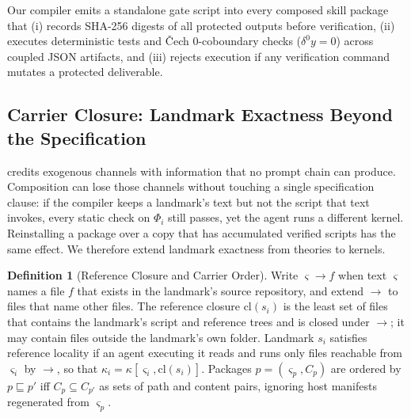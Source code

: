 \documentclass[11pt]{article}
\theoremstyle{definition}
\newtheorem{definition}{Definition}
\theoremstyle{plain}
\begin{document}
Our compiler emits a standalone gate script into every composed skill package that (i) records SHA-256 digests of all protected outputs before verification, (ii) executes deterministic tests and \v{C}ech 0-coboundary checks ($\delta^0 y = 0$) across coupled JSON artifacts, and (iii) rejects execution if any verification command mutates a protected deliverable.

\subsection{Carrier Closure: Landmark Exactness Beyond the Specification}
\label{subsec:carrier}

 credits exogenous channels with information that no prompt chain can produce. Composition can lose those channels without touching a single specification clause: if the compiler keeps a landmark's text but not the script that text invokes, every static check on $\Phi_i$ still passes, yet the agent runs a different kernel. Reinstalling a package over a copy that has accumulated verified scripts has the same effect. We therefore extend landmark exactness from theories to kernels.

\begin{definition}[Reference Closure and Carrier Order]
\label{def:carrier}
Write $\varsigma \to f$ when text $\varsigma$ names a file $f$ that exists in the landmark's source repository, and extend $\to$ to files that name other files. The reference closure $\mathrm{cl}(s_i)$ is the least set of files that contains the landmark's script and reference trees and is closed under $\to$; it may contain files outside the landmark's own folder. Landmark $s_i$ satisfies reference locality if an agent executing it reads and runs only files reachable from $\varsigma_i$ by $\to$, so that $\kappa_i = \kappa[\varsigma_i, \mathrm{cl}(s_i)]$. Packages $p = (\varsigma_p, C_p)$ are ordered by $p \sqsubseteq p'$ iff $C_p \subseteq C_{p'}$ as sets of path and content pairs, ignoring host manifests regenerated from $\varsigma_p$.
\end{definition}
\end{document}

